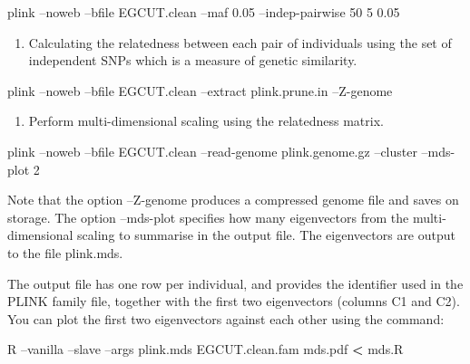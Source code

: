 \documentclass[]{book}
\newenvironment{Shaded}{\begin{snugshade}}{\end{snugshade}}
\newcommand{\OperatorTok}[1]{\textcolor[rgb]{0.81,0.36,0.00}{\textbf{#1}}}
\newcommand{\ExtensionTok}[1]{#1}
\newcommand{\NormalTok}[1]{#1}
\providecommand{\tightlist}{%
  \setlength{\itemsep}{0pt}\setlength{\parskip}{0pt}}
\begin{document}
\begin{Shaded}
\begin{Highlighting}[]
\ExtensionTok{plink}\NormalTok{ --noweb --bfile EGCUT.clean --maf 0.05 --indep-pairwise 50 5 0.05}
\end{Highlighting}
\end{Shaded}

\begin{enumerate}
\def\labelenumi{\arabic{enumi}.}
\setcounter{enumi}{1}
\tightlist
\item
  Calculating the relatedness between each pair of individuals using the
  set of independent SNPs which is a measure of genetic similarity.
\end{enumerate}

\begin{Shaded}
\begin{Highlighting}[]
\ExtensionTok{plink}\NormalTok{ --noweb --bfile EGCUT.clean --extract plink.prune.in --Z-genome}
\end{Highlighting}
\end{Shaded}

\begin{enumerate}
\def\labelenumi{\arabic{enumi}.}
\setcounter{enumi}{2}
\tightlist
\item
  Perform multi-dimensional scaling using the relatedness matrix.
\end{enumerate}

\begin{Shaded}
\begin{Highlighting}[]
\ExtensionTok{plink}\NormalTok{ --noweb --bfile EGCUT.clean --read-genome plink.genome.gz --cluster --mds-plot 2}
\end{Highlighting}
\end{Shaded}

Note that the option --Z-genome produces a compressed genome file and
saves on storage. The option --mds-plot specifies how many eigenvectors
from the multi-dimensional scaling to summarise in the output file. The
eigenvectors are output to the file plink.mds.

The output file has one row per individual, and provides the identifier
used in the PLINK family file, together with the first two eigenvectors
(columns C1 and C2). You can plot the first two eigenvectors against
each other using the command:

\begin{Shaded}
\begin{Highlighting}[]
\ExtensionTok{R}\NormalTok{ --vanilla --slave --args plink.mds EGCUT.clean.fam mds.pdf }\OperatorTok{<}\NormalTok{ mds.R}
\end{Highlighting}
\end{Shaded}
\end{document}
